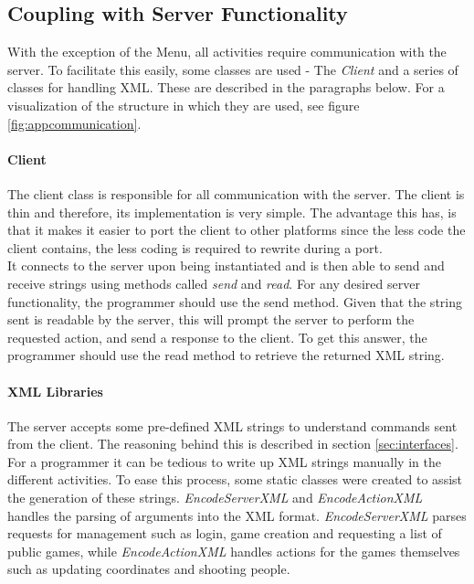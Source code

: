 \subsection{Coupling with Server Functionality}
\label{subsec:server-coupling}
With the exception of the Menu, all activities require communication with the server. To facilitate this easily, some classes are used - The \textit{Client} and a series of classes for handling XML. These are described in the paragraphs below. For a visualization of the structure in which they are used, see figure \ref{fig:appcommunication}.

\paragraph{Client}
The client class is responsible for all communication with the server. The client is thin and therefore, its implementation is very simple. The advantage this has, is that it makes it easier to port the client to other platforms since the less code the client contains, the less coding is required to rewrite during a port.\\

It connects to the server upon being instantiated and is then able to send and receive strings using methods called \textit{send} and \textit{read}. For any desired server functionality, the programmer should use the send method. Given that the string sent is readable by the server, this will prompt the server to perform the requested action, and send a response to the client. To get this answer, the programmer should use the read method to retrieve the returned XML string.

\paragraph{XML Libraries}
The server accepts some pre-defined XML strings to understand commands sent from the client. The reasoning behind this is described in section \ref{sec:interfaces}. For a programmer it can be tedious to write up XML strings manually in the different activities. To ease this process, some static classes were created to assist the generation of these strings. \textit{EncodeServerXML} and \textit{EncodeActionXML} handles the parsing of arguments into the XML format. \textit{EncodeServerXML} parses requests for management such as login, game creation and requesting a list of public games, while \textit{EncodeActionXML} handles actions for the games themselves such as updating coordinates and shooting people.

